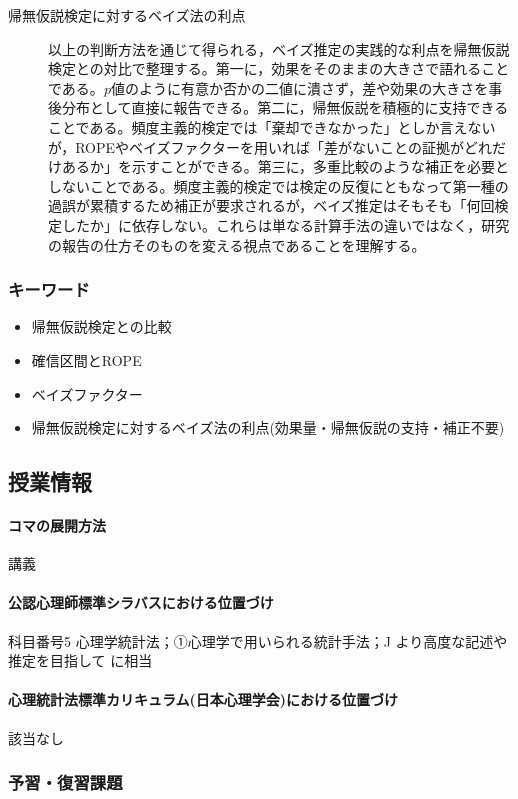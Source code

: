 \begin{description}
	\item[帰無仮説検定に対するベイズ法の利点] 以上の判断方法を通じて得られる，ベイズ推定の実践的な利点を帰無仮説検定との対比で整理する。第一に，効果をそのままの大きさで語れることである。$p$値のように有意か否かの二値に潰さず，差や効果の大きさを事後分布として直接に報告できる。第二に，帰無仮説を積極的に支持できることである。頻度主義的検定では「棄却できなかった」としか言えないが，ROPEやベイズファクターを用いれば「差がないことの証拠がどれだけあるか」を示すことができる。第三に，多重比較のような補正を必要としないことである。頻度主義的検定では検定の反復にともなって第一種の過誤が累積するため補正が要求されるが，ベイズ推定はそもそも「何回検定したか」に依存しない。これらは単なる計算手法の違いではなく，研究の報告の仕方そのものを変える視点であることを理解する。

\end{description}
\subsubsection{キーワード}
\begin{itemize}
	\item 帰無仮説検定との比較
	\item 確信区間とROPE
	\item ベイズファクター
	\item 帰無仮説検定に対するベイズ法の利点(効果量・帰無仮説の支持・補正不要)
\end{itemize}
\subsection{授業情報}
\paragraph{コマの展開方法}
講義
\paragraph{公認心理師標準シラバスにおける位置づけ}
科目番号5 心理学統計法；①心理学で用いられる統計手法；J より高度な記述や推定を目指して に相当
\paragraph{心理統計法標準カリキュラム(日本心理学会)における位置づけ}
該当なし
\subsubsection{予習・復習課題}
